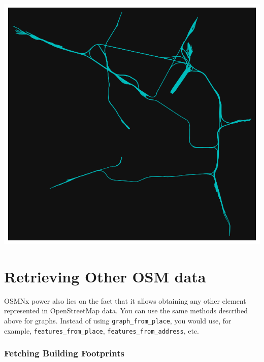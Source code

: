 \documentclass[
  letterpaper,
  DIV=11,
  numbers=noendperiod]{scrreprt}
\begin{document}
\includegraphics{labs/w07_OSM_files/figure-pdf/cell-41-output-1.png}

\section{Retrieving Other OSM data}\label{retrieving-other-osm-data}

OSMNx power also lies on the fact that it allows obtaining any other
element represented in OpenStreetMap data. You can use the same methods
described above for graphs. Instead of using
\texttt{graph\_from\_place}, you would use, for example,
\texttt{features\_from\_place}, \texttt{features\_from\_address}, etc.

\subsubsection{Fetching Building
Footprints}\label{fetching-building-footprints}
\end{document}
